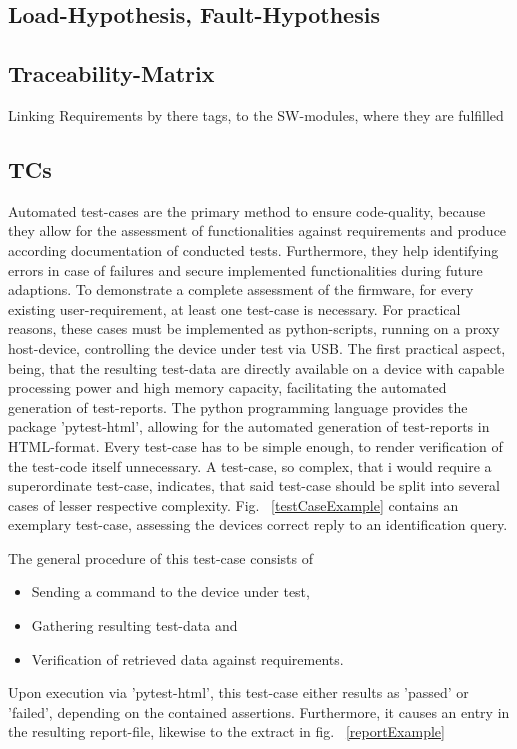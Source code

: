 \documentclass[master,english,smartquotes,apa]{hgbthesis}
\begin{document}
			\subsection{Load-Hypothesis, Fault-Hypothesis}
			\subsection{Traceability-Matrix}
			Linking Requirements by there tags, to the SW-modules, where they are fulfilled
			\subsection{TCs}
			Automated test-cases are the primary method to ensure code-quality, because they allow for the assessment of functionalities against requirements and produce according documentation of conducted tests. Furthermore, they help identifying  errors in case of failures and secure implemented functionalities during future adaptions. To demonstrate a complete assessment of the firmware, for every existing user-requirement, at least one test-case is necessary. For practical reasons, these cases must be implemented as python-scripts, running on a proxy host-device, controlling the device under test via USB. The first practical aspect, being, that the resulting test-data are directly available on a device with capable processing power and high memory capacity, facilitating the automated generation of test-reports. The python programming language provides the package 'pytest-html', allowing for the automated generation of test-reports in HTML-format. Every test-case has to be simple enough, to render verification of the test-code itself unnecessary. A test-case, so complex, that i would require a superordinate test-case, indicates, that said test-case should be split into several cases of lesser respective complexity. Fig. ~\ref{testCaseExample} contains an exemplary test-case, assessing the devices correct reply to an identification query. 
			
			The general procedure of this test-case consists of 
			\begin{itemize} \setlength\itemsep{1px}
			\item Sending a command to the device under test,
			\item Gathering resulting test-data and
			\item Verification of retrieved data against requirements.
			\end{itemize}
			Upon execution via 'pytest-html', this test-case either results as 'passed' or 'failed', depending on the contained assertions. Furthermore, it causes an entry in the resulting report-file, likewise to the extract in fig. ~\ref{reportExample}
			
\end{document}
